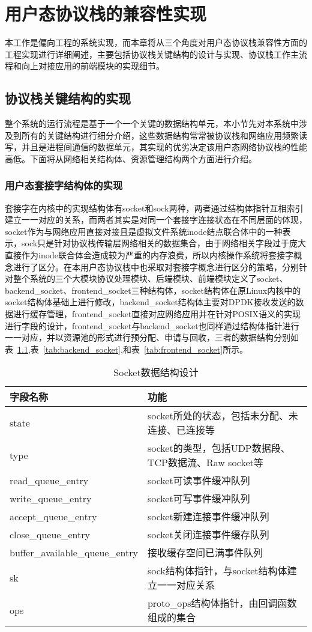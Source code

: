 \chapter{用户态协议栈的兼容性实现}
本工作是偏向工程的系统实现，而本章将从三个角度对用户态协议栈兼容性方面的工程实现进行详细阐述，主要包括协议栈关键结构的设计与实现、协议栈工作主流程和向上对接应用的前端模块的实现细节。

\section{协议栈关键结构的实现}
整个系统的运行流程是基于一个一个关键的数据结构单元，本小节先对本系统中涉及到所有的关键结构进行细分介绍，这些数据结构常常被协议栈和网络应用频繁读写，并且是进程间通信的数据单元，其实现的优劣决定该用户态网络协议栈的性能高低。下面将从网络相关结构体、资源管理结构两个方面进行介绍。
\subsection{用户态套接字结构体的实现}
套接字在内核中的实现结构体有socket和sock两种，两者通过结构体指针互相索引建立一一对应的关系，而两者其实是对同一个套接字连接状态在不同层面的体现，socket作为与网络应用直接对接且是虚拟文件系统inode结点联合体中的一种表示，sock只是针对协议栈传输层网络相关的数据集合，由于网络相关字段过于庞大直接作为inode联合体会造成较为严重的内存浪费，所以内核操作系统将套接字概念进行了区分。在本用户态协议栈中也采取对套接字概念进行区分的策略，分别针对整个系统的三个大模块协议处理模块、后端模块、前端模块定义了socket、backend\_socket、frontend\_socket三种结构体，socket结构体在原Linux内核中的socket结构体基础上进行修改，backend\_socket结构体主要对DPDK接收发送的数据进行缓存管理，frontend\_socket直接对应网络应用并在针对POSIX语义的实现进行字段的设计，frontend\_socket与backend\_socket也同样通过结构体指针进行一一对应，并以资源池的形式进行预分配、申请与回收，三者的数据结构分别如表~\ref{tab:socket},表~\ref{tab:backend_socket},和表~\ref{tab:frontend_socket}所示。

\begin{table}[]
\centering
\caption{Socket数据结构设计}
\label{tab:socket}
\begin{tabular}{ll}
\toprule[1.5pt]
\textbf{字段名称} & \textbf{功能} \\ 
\midrule[1pt]
state & socket所处的状态，包括未分配、未连接、已连接等 \\ 
type & socket的类型，包括UDP数据段、TCP数据流、Raw socket等\\ 
read\_queue\_entry & socket可读事件缓冲队列 \\ 
write\_queue\_entry & socket可写事件缓冲队列 \\ 
accept\_queue\_entry & socket新建连接事件缓冲队列 \\ 
close\_queue\_entry & socket关闭连接事件缓存队列 \\
buffer\_available\_queue\_entry & 接收缓存空间已满事件队列 \\ 
sk & sock结构体指针，与socket结构体建立一一对应关系 \\
ops & proto\_ops结构体指针，由回调函数组成的集合 \\
\bottomrule[1.5pt]
\end{tabular}
\end{table}

